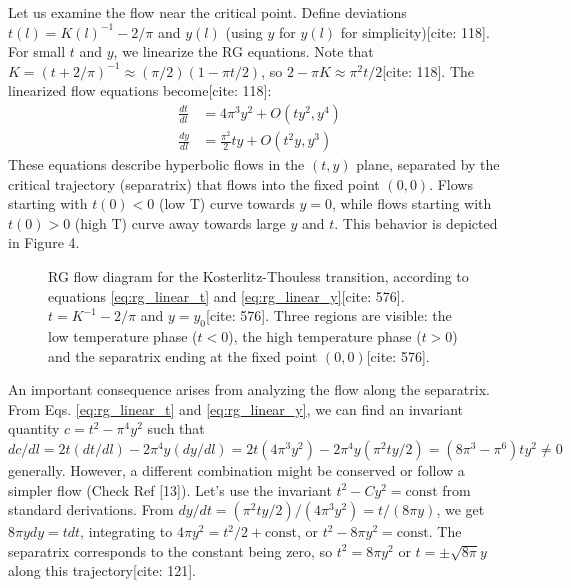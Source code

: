\documentclass[11pt]{article}
\begin{document}
Let us examine the flow near the critical point. Define deviations $t(l) = K(l)^{-1} - 2/\pi$ and $y(l)$ (using $y$ for $y(l)$ for simplicity)[cite: 118]. For small $t$ and $y$, we linearize the RG equations. Note that $K = (t + 2/\pi)^{-1} \approx (\pi/2)(1 - \pi t / 2)$, so $2 - \pi K \approx \pi^2 t / 2$[cite: 118]. The linearized flow equations become[cite: 118]:
\begin{align}
\frac{dt}{dl} &= 4 \pi^3 y^2 + O(t y^2, y^4) \label{eq:rg_linear_t} \\
\frac{dy}{dl} &= \frac{\pi^2}{2} t y + O(t^2 y, y^3) \label{eq:rg_linear_y}
\end{align}
These equations describe hyperbolic flows in the $(t, y)$ plane, separated by the critical trajectory (separatrix) that flows into the fixed point $(0, 0)$. Flows starting with $t(0) < 0$ (low T) curve towards $y=0$, while flows starting with $t(0) > 0$ (high T) curve away towards large $y$ and $t$. This behavior is depicted in Figure 4.

\begin{figure}[h!]
    \centering
    \caption{RG flow diagram for the Kosterlitz-Thouless transition, according to equations \eqref{eq:rg_linear_t} and \eqref{eq:rg_linear_y}[cite: 576]. $t=K^{-1}-2/\pi$ and $y=y_0$[cite: 576]. Three regions are visible: the low temperature phase ($t<0$), the high temperature phase ($t>0$) and the separatrix ending at the fixed point $(0,0)$[cite: 576].}
    \label{fig:rg_flow}
\end{figure}

An important consequence arises from analyzing the flow along the separatrix. From Eqs. \eqref{eq:rg_linear_t} and \eqref{eq:rg_linear_y}, we can find an invariant quantity $c = t^2 - \pi^4 y^2$ such that $dc/dl = 2t(dt/dl) - 2\pi^4 y(dy/dl) = 2t(4\pi^3 y^2) - 2\pi^4 y (\pi^2 t y / 2) = (8\pi^3 - \pi^6) t y^2 \neq 0$ generally. However, a different combination might be conserved or follow a simpler flow (Check Ref [13]). Let's use the invariant $t^2 - C y^2 = \text{const}$ from standard derivations. From $dy/dt = (\pi^2 t y / 2) / (4 \pi^3 y^2) = t / (8 \pi y)$, we get $8\pi y dy = t dt$, integrating to $4\pi y^2 = t^2/2 + \text{const}$, or $t^2 - 8\pi y^2 = \text{const}$. The separatrix corresponds to the constant being zero, so $t^2 = 8\pi y^2$ or $t = \pm \sqrt{8\pi} y$ along this trajectory[cite: 121].
\end{document}
